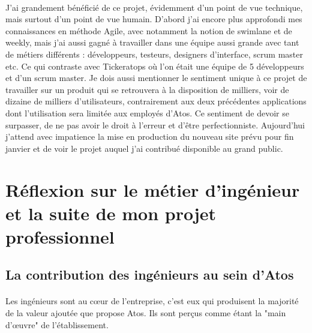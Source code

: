 \documentclass[12pt]{article}
\begin{document}
\begin {sloppypar}
\paragraph{}
J'ai grandement bénéficié de ce projet, évidemment d'un point de vue technique, mais surtout d'un point 
de vue humain. D'abord j'ai encore plus approfondi mes connaissances en méthode Agile, avec notamment
la notion de swimlane et de weekly, mais j'ai aussi gagné à travailler dans une équipe aussi grande avec 
tant de métiers différents : développeurs, testeurs, designers d'interface, scrum master etc. Ce qui contraste
avec Tickeratops où l'on était une équipe de 5 développeurs et d'un scrum master. Je dois aussi mentionner
le sentiment unique à ce projet de travailler sur un produit qui se retrouvera à la disposition de milliers,
voir de dizaine de milliers d'utilisateurs, contrairement aux deux précédentes applications dont l'utilisation
sera limitée aux employés d'Atos. Ce sentiment de devoir se surpasser, de ne pas avoir le droit à l'erreur 
et d'être perfectionniste. Aujourd'hui j'attend avec impatience la mise en production du nouveau site 
prévu pour fin janvier et de voir le projet auquel j'ai contribué disponible au grand public.

\newpage
\section{Réflexion sur le métier d'ingénieur et la suite de mon projet professionnel}
\subsection{La contribution des ingénieurs au sein d'Atos}
\paragraph{}
Les ingénieurs sont au cœur de l'entreprise, c'est eux qui produisent la majorité de la valeur 
ajoutée que propose Atos. Ils sont perçus comme étant la "main d'œuvre" de l'établissement.

\end{sloppypar}
\end{document}
